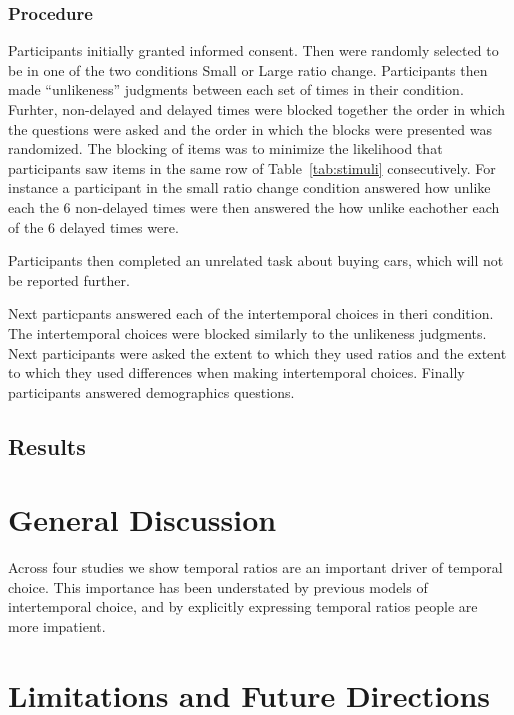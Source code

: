 \documentclass[]{article}
\begin{document}
\subsubsection{Procedure}

Participants initially granted informed consent. 
Then were randomly selected to be in one of the two conditions Small or Large ratio change. 
Participants then made ``unlikeness'' judgments between each set of times in their condition. 
Furhter, non-delayed and delayed times were blocked together the order in which the questions were asked and the order in which the blocks were presented was randomized. 
The blocking of items was to minimize the likelihood that participants saw items in the same row of Table~\ref{tab:stimuli} consecutively. 
For instance a participant in the small ratio change condition answered how unlike each  the 6 non-delayed times were then answered the how unlike eachother each of the 6 delayed times were. 

Participants then completed an unrelated task about buying cars, which will not be reported further.

Next particpants answered each of the intertemporal choices in theri condition. 
The intertemporal choices were blocked similarly to the unlikeness judgments. 
Next participants were asked the extent to which they used ratios and the extent to which they used differences when making intertemporal choices. 
Finally participants answered demographics questions. 

\subsection{Results}

\section{General Discussion}

Across four studies we show temporal ratios are an important driver of temporal choice. 
This importance has been understated by previous models of intertemporal choice, and by explicitly expressing temporal ratios people are more impatient. 


\section{Limitations and Future Directions}



\setlength{\bibleftmargin}{.125in}
\setlength{\bibindent}{-\bibleftmargin}


\end{document}
